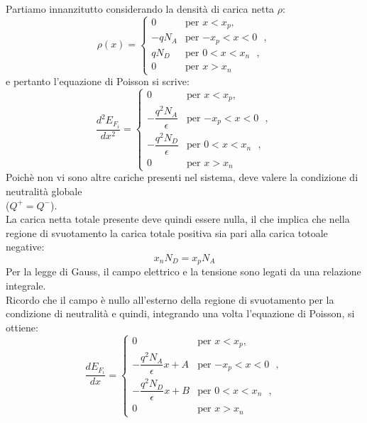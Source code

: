 \noindent\begin{minipage}{0.6\textwidth}
    Partiamo innanzitutto considerando la densità di carica netta $\rho$:
\begin{equation}
    \rho(x) = \begin{cases}
    0&  \text{per $x < x_p$},\\
    -qN_A& \text{per $-x_p<x<0$ },\\
    qN_D& \text{per $0<x<x_n$ },\\
    0& \text{per $x>x_n$ }
\end{cases}
\end{equation}
e pertanto l'equazione di Poisson si scrive:
\begin{equation}
    \dfrac{d^2E_{F_i}}{dx^2} = \begin{cases}
    0 & \text{per $x < x_p$},\\
    -\dfrac{q^2N_A}{\epsilon}& \text{per $-x_p<x<0$ },\\
    -\dfrac{q^2N_D}{\epsilon}& \text{per $0<x<x_n$ },\\
    0 & \text{per $x>x_n$ }
\end{cases}
\end{equation}
Poichè non vi sono altre cariche presenti nel sistema, deve valere la condizione di neutralità globale \\ ($Q^+=Q^-$).\\
La carica netta totale presente deve quindi essere nulla, il che implica che nella regione di svuotamento la carica totale positiva sia pari alla carica totoale negative:
\begin{equation}
    x_n N_D=x_p N_A
\end{equation}
Per la legge di Gauss, il campo elettrico e la tensione sono legati da una relazione integrale.\\
Ricordo che il campo è nullo all'esterno della regione di svuotamento per la condizione di neutralità e quindi,  integrando una volta l'equazione di Poisson, si ottiene:
\begin{equation}
    \dfrac{dE_{F_i}}{dx} = \begin{cases}
    0 & \text{per $x < x_p$},\\
    -\dfrac{q^2N_A}{\epsilon} x + A & \text{per $-x_p<x<0$ },\\
    -\dfrac{q^2N_D}{\epsilon} x + B & \text{per $0<x<x_n$ },\\
    0 & \text{per $x>x_n$ }
\end{cases}
\end{equation}
\end{minipage}
